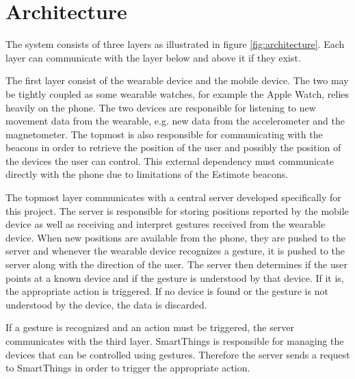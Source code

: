 \section{Architecture}

The system consists of three layers as illustrated in figure \ref{fig:architecture}. 
Each layer can communicate with the layer below and above it if they exist.

The first layer consist of the wearable device and the mobile device. 
The two may be tightly coupled as some wearable watches, for example the Apple Watch, relies heavily on the phone. 
The two devices are responsible for listening to new movement data from the wearable, e.g. new data from the accelerometer and the magnetometer. 
The topmost is also responsible for communicating with the beacons in order to retrieve the position of the user and possibly the position of the devices the user can control. 
This external dependency must communicate directly with the phone due to limitations of the Estimote beacons.

The topmost layer communicates with a central server developed specifically for this project. 
The server is responsible for storing positions reported by the mobile device as well as receiving and interpret gestures received from the wearable device.
When new positions are available from the phone, they are pushed to the server and whenever the wearable device recognizes a gesture, 
it is pushed to the server along with the direction of the user.
The server then determines if the user points at a known device and if the gesture is understood by that device. 
If it is, the appropriate action is triggered. 
If no device is found or the gesture is not understood by the device, the data is discarded.


If a gesture is recognized and an action must be triggered, the server communicates with the third layer. 
SmartThings is responsible for managing the devices that can be controlled using gestures. 
Therefore the server sends a request to SmartThings in order to trigger the appropriate action.

